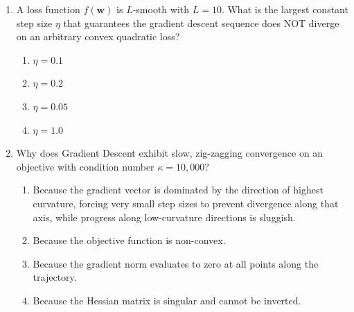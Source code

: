 \begin{enumerate}[label=\textbf{MCQ\arabic*.}]
    \item A loss function $f(\mathbf{w})$ is $L$-smooth with $L = 10$. What is the largest constant step size $\eta$ that guarantees the gradient descent sequence does NOT diverge on an arbitrary convex quadratic loss?
    \begin{enumerate}[label=(\alph*)]
        \item $\eta = 0.1$
        \item $\eta = 0.2$
        \item $\eta = 0.05$
        \item $\eta = 1.0$
    \end{enumerate}

    \item Why does Gradient Descent exhibit slow, zig-zagging convergence on an objective with condition number $\kappa = 10{,}000$?
    \begin{enumerate}[label=(\alph*)]
        \item Because the gradient vector is dominated by the direction of highest curvature, forcing very small step sizes to prevent divergence along that axis, while progress along low-curvature directions is sluggish.
        \item Because the objective function is non-convex.
        \item Because the gradient norm evaluates to zero at all points along the trajectory.
        \item Because the Hessian matrix is singular and cannot be inverted.
    \end{enumerate}
\end{enumerate}
